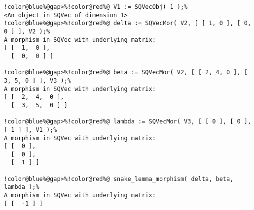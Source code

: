 \begin{Verbatim}[commandchars=!@\%,frame=single]
!color@blue%@gap>%!color@red%@ V1 := SQVecObj( 1 );%
<An object in SQVec of dimension 1>
!color@blue%@gap>%!color@red%@ delta := SQVecMor( V2, [ [ 1, 0 ], [ 0, 0 ] ], V2 );%
A morphism in SQVec with underlying matrix:
[ [  1,  0 ],
  [  0,  0 ] ]

!color@blue%@gap>%!color@red%@ beta := SQVecMor( V2, [ [ 2, 4, 0 ], [ 3, 5, 0 ] ], V3 );%
A morphism in SQVec with underlying matrix:
[ [  2,  4,  0 ],
  [  3,  5,  0 ] ]

!color@blue%@gap>%!color@red%@ lambda := SQVecMor( V3, [ [ 0 ], [ 0 ], [ 1 ] ], V1 );%
A morphism in SQVec with underlying matrix:
[ [  0 ],
  [  0 ],
  [  1 ] ]

!color@blue%@gap>%!color@red%@ snake_lemma_morphism( delta, beta, lambda );%
A morphism in SQVec with underlying matrix:
[ [  -1 ] ]

\end{Verbatim}
